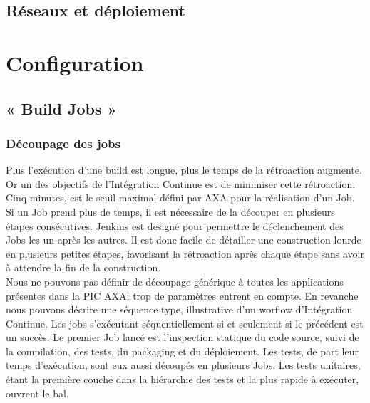     \subsection{Réseaux et déploiement}

  \section{Configuration}

    \subsection{« Build Jobs »}

      \subsubsection{Découpage des jobs}
      Plus l'exécution d'une build est longue, plus le temps de la rétroaction augmente. Or un des objectifs de l'Intégration Continue est de minimiser cette rétroaction. Cinq minutes, est le seuil maximal défini par AXA pour la réalisation d'un Job. Si un Job prend plus de temps, il est nécessaire de la découper en plusieurs étapes consécutives. Jenkins est designé pour permettre le déclenchement des Jobs les un après les autres. Il est donc facile de détailler une construction lourde en plusieurs petites étapes, favorisant la rétroaction après chaque étape sans avoir à attendre la fin de la construction. \\

      Nous ne pouvons pas définir de découpage générique à toutes les applications présentes dans la PIC AXA; trop de paramètres entrent en compte. En revanche nous pouvons décrire une séquence type, illustrative d'un worflow d'Intégration Continue. Les jobs s'exécutant séquentiellement si et seulement si le précédent est un succès. Le premier Job lancé est l'inspection statique du code source, suivi de la compilation, des tests, du packaging et du déploiement. Les tests, de part leur temps d'exécution, sont eux aussi découpés en plusieurs Jobs. Les tests unitaires, étant la première couche dans la hiérarchie des tests et la plus rapide à exécuter, ouvrent le bal.

